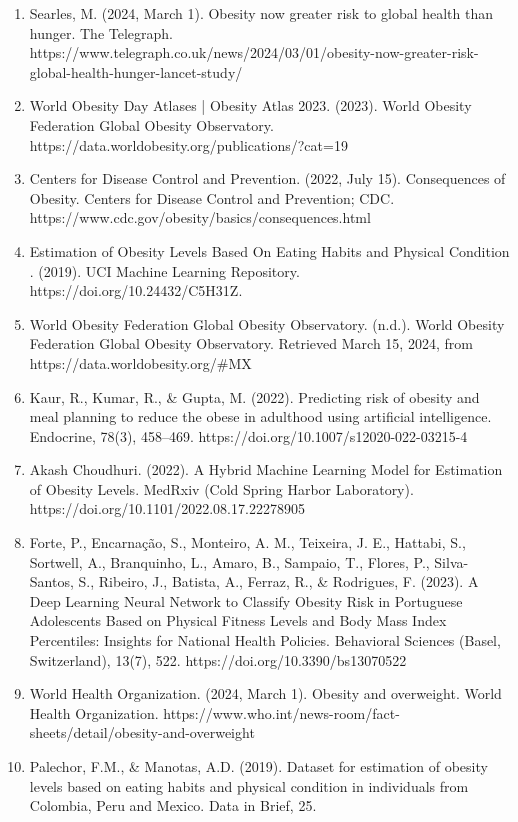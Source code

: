 \documentclass[11pt]{article}
\begin{document}
\begin{enumerate}
    \item Searles, M. (2024, March 1). Obesity now greater risk to global health than hunger. The Telegraph. https://www.telegraph.co.uk/news/2024/03/01/obesity-now-greater-risk-global-health-hunger-lancet-study/
    \item World Obesity Day Atlases | Obesity Atlas 2023. (2023). World Obesity Federation Global Obesity Observatory. https://data.worldobesity.org/publications/?cat=19
    \item Centers for Disease Control and Prevention. (2022, July 15). Consequences of Obesity. Centers for Disease Control and Prevention; CDC. https://www.cdc.gov/obesity/basics/consequences.html
    \item Estimation of Obesity Levels Based On Eating Habits and Physical Condition . (2019). UCI Machine Learning Repository. https://doi.org/10.24432/C5H31Z.
    \item World Obesity Federation Global Obesity Observatory. (n.d.). World Obesity Federation Global Obesity Observatory. Retrieved March 15, 2024, from https://data.worldobesity.org/\#MX
    \item Kaur, R., Kumar, R., \& Gupta, M. (2022). Predicting risk of obesity and meal planning to reduce the obese in adulthood using artificial intelligence. Endocrine, 78(3), 458–469. https://doi.org/10.1007/s12020-022-03215-4
    \item Akash Choudhuri. (2022). A Hybrid Machine Learning Model for Estimation of Obesity Levels. MedRxiv (Cold Spring Harbor Laboratory). https://doi.org/10.1101/2022.08.17.22278905
    \item Forte, P., Encarnação, S., Monteiro, A. M., Teixeira, J. E., Hattabi, S., Sortwell, A., Branquinho, L., Amaro, B., Sampaio, T., Flores, P., Silva-Santos, S., Ribeiro, J., Batista, A., Ferraz, R., \& Rodrigues, F. (2023). A Deep Learning Neural Network to Classify Obesity Risk in Portuguese Adolescents Based on Physical Fitness Levels and Body Mass Index Percentiles: Insights for National Health Policies. Behavioral Sciences (Basel, Switzerland), 13(7), 522. https://doi.org/10.3390/bs13070522
    \item World Health Organization. (2024, March 1). Obesity and overweight. World Health Organization. https://www.who.int/news-room/fact-sheets/detail/obesity-and-overweight
    \item Palechor, F.M., \& Manotas, A.D. (2019). Dataset for estimation of obesity levels based on eating habits and physical condition in individuals from Colombia, Peru and Mexico. Data in Brief, 25.
\end{enumerate}
\end{document}

